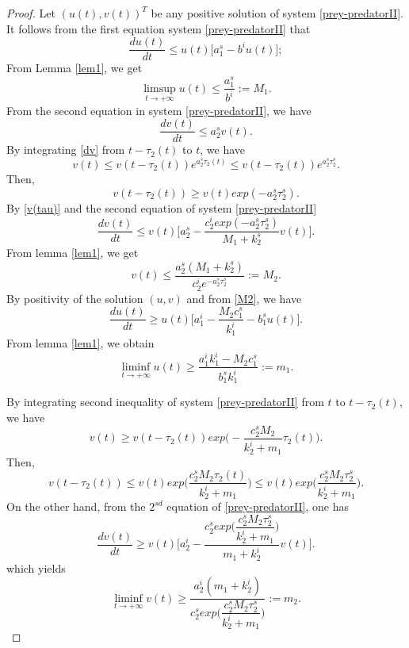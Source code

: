 \documentclass[[a4paper,10pt]{article}
\begin{document}
\begin{proof}
 
Let $(u(t),v(t))^T$ be any positive solution of system \eqref{prey-predatorII}. It follows from the first equation system \eqref{prey-predatorII} that
\begin{equation}\label{du}
\dfrac{du(t)}{dt}\leq u(t)\big [a_1^s-b^iu(t)\big]; 
\end{equation}
From Lemma \ref{lem1}, we get
\begin{equation}\label{M1}
\limsup_{t\rightarrow +\infty} u(t)\leq \dfrac{a_1^s}{b^i}:=M_1.
\end{equation}
From the second equation in system \eqref{prey-predatorII}, we have
\begin{equation}\label{dv}
\dfrac{dv(t)}{dt}\leq a_2^s v(t).
\end{equation}
By integrating \eqref{dv} from $t-\tau_2(t)$ to $t$, we have
\begin{equation}\label{v}
v(t)\leq v(t-\tau_2(t))e^{a_2^s \tau_2(t)}\leq v(t-\tau_2(t))e^{a_2^s \tau_2^s}.
\end{equation}
Then,
\begin{equation}\label{v(tau)}
v(t-\tau_2(t))\geq v(t) exp(-a_2^s \tau_2^s).
\end{equation}
By \eqref{v(tau)} and the second equation of system \eqref{prey-predatorII}
\begin{equation}\label{d2v} 
\dfrac{dv(t)}{dt}\leq  v(t)\bigg[a_2^s-\dfrac{c_2^iexp\left(-a_2^s \tau_2^s\right)}{M_1+k_2^s} v(t) \bigg].
\end{equation}
From lemma \ref{lem1}, we get 
\begin{equation}\label{M2}
v(t)\leq \dfrac{a^s_2(M_1+k_2^s)}{c_2^ie^{-a_2^s \tau_2^s}}:=M_2.  
\end{equation}
By positivity of the solution $(u,v)$ and from \eqref{M2}, we have
\begin{equation}\label{d2u}
\dfrac{du(t)}{dt}\geq u(t)\big [a_1^i-\dfrac{M_2c_1^s}{k_1^i}-b_1^su(t)\big].\end{equation}
From lemma \ref{lem1}, we obtain
$$\liminf_{t\rightarrow +\infty}u(t)\geq \dfrac{a_1^ik_1^i-M_2 c_1^s}{b_1^s k^i_1}:=m_1.$$

By integrating  second inequality of system \eqref{prey-predatorII} from $t$ to $t-\tau_2(t)$, we have 
\begin{equation}
v(t)\geq v(t-\tau_2(t))exp\bigg(-\dfrac{c_2^s M_2}{k_2^i+m_1}\tau_2(t)\bigg).
\end{equation}
Then,
\begin{equation}
 v(t-\tau_2(t))\leq v(t)exp\bigg(\dfrac{c_2^s M_2\tau_2(t)}{k_2^i+m_1}\bigg)\leq v(t)exp\bigg(\dfrac{c_2^s M_2\tau_2^s}{k_2^i+m_1}\bigg).
\end{equation}
On the other hand, from the $2^{sd}$ equation of  \eqref{prey-predatorII}, one has
\begin{equation}\label{ddv}
\dfrac{dv(t)}{dt}\geq v(t)\bigg[a_2^i-\dfrac{c_2^sexp\bigg(\dfrac{c_2^s M_2\tau_2^s}{k_2^i+m_1}\bigg)}{m_1+k_2^i}v(t)\bigg].\end{equation}
which yields 
$$\liminf_{t\rightarrow +\infty}v(t)\geq \dfrac{a_2^i(m_1+k_2^i)}{c_2^sexp\bigg({\dfrac{c_2^s M_2\tau_2^s}{k_2^i+m_1}}\bigg)}:=m_2.$$
\end{proof}
\end{document}
